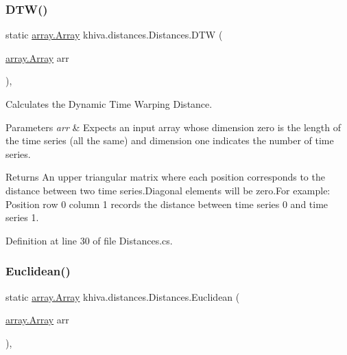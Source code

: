 \subsubsection{\texorpdfstring{D\+T\+W()}{DTW()}}
{\footnotesize\ttfamily static \mbox{\hyperlink{classkhiva_1_1array_1_1_array}{array.\+Array}} khiva.\+distances.\+Distances.\+D\+TW (\begin{DoxyParamCaption}\item[{\mbox{\hyperlink{classkhiva_1_1array_1_1_array}{array.\+Array}}}]{arr }\end{DoxyParamCaption})\hspace{0.3cm}{\ttfamily [inline]}, {\ttfamily [static]}}



Calculates the Dynamic Time Warping Distance. 


\begin{DoxyParams}{Parameters}
{\em arr} & Expects an input array whose dimension zero is the length of the time series (all the same) and dimension one indicates the number of time series.\\
\hline
\end{DoxyParams}
\begin{DoxyReturn}{Returns}
An upper triangular matrix where each position corresponds to the distance between two time series.\+Diagonal elements will be zero.\+For example\+: Position row 0 column 1 records the distance between time series 0 and time series 1.
\end{DoxyReturn}


Definition at line 30 of file Distances.\+cs.

\mbox{\label{classkhiva_1_1distances_1_1_distances_af54414ba6d52bf6e17d43e4e7c34cd38}} 
\subsubsection{\texorpdfstring{Euclidean()}{Euclidean()}}
{\footnotesize\ttfamily static \mbox{\hyperlink{classkhiva_1_1array_1_1_array}{array.\+Array}} khiva.\+distances.\+Distances.\+Euclidean (\begin{DoxyParamCaption}\item[{\mbox{\hyperlink{classkhiva_1_1array_1_1_array}{array.\+Array}}}]{arr }\end{DoxyParamCaption})\hspace{0.3cm}{\ttfamily [inline]}, {\ttfamily [static]}}



